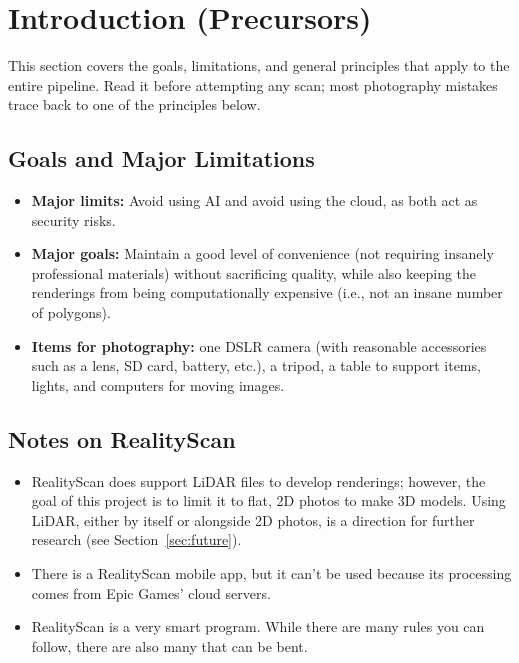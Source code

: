\documentclass[11pt]{article}
\begin{document}
\newpage

\tableofcontents

\newpage

\section{Introduction (Precursors)}
This section covers the goals, limitations, and general principles that apply to the entire pipeline. Read it before attempting any scan; most photography mistakes trace back to one of the principles below.

\subsection{Goals and Major Limitations}
\begin{itemize}[leftmargin=1.4em]
  \item \textbf{Major limits:} Avoid using AI and avoid using the cloud, as both act as security risks.
  \item \textbf{Major goals:} Maintain a good level of convenience (not requiring insanely professional materials) without sacrificing quality, while also keeping the renderings from being computationally expensive (i.e., not an insane number of polygons).
  \item \textbf{Items for photography:} one DSLR camera (with reasonable accessories such as a lens, SD card, battery, etc.), a tripod, a table to support items, lights, and computers for moving images.
\end{itemize}

\subsection{Notes on RealityScan}
\begin{itemize}[leftmargin=1.4em]
  \item RealityScan does support LiDAR files to develop renderings; however, the goal of this project is to limit it to flat, 2D photos to make 3D models. Using LiDAR, either by itself or alongside 2D photos, is a direction for further research (see Section~\ref{sec:future}).
  \item There is a RealityScan mobile app, but it can't be used because its processing comes from Epic Games' cloud servers.
  \item RealityScan is a very smart program. While there are many rules you can follow, there are also many that can be bent.
\end{itemize}
\end{document}

